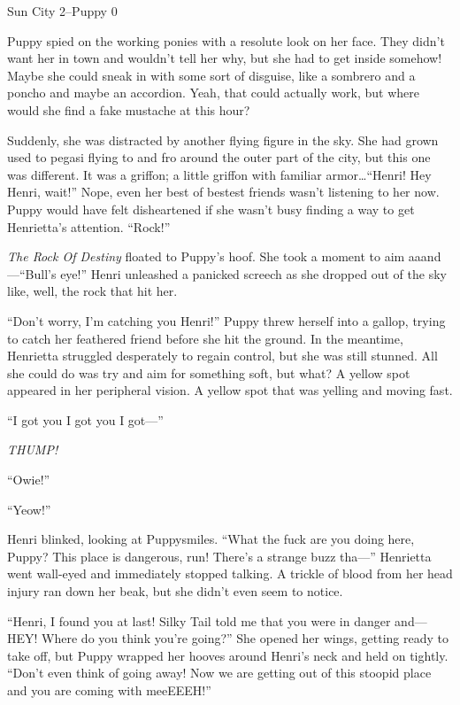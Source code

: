\begin{center}
	Sun City 2--Puppy 0
\end{center}

\horizonline


Puppy spied on the working ponies with a resolute look on her face. They didn't want her in town and wouldn't tell her why, but she had to get inside somehow! Maybe she could sneak in with some sort of disguise, like a sombrero and a poncho and maybe an accordion. Yeah, that could actually work, but where would she find a fake mustache at this hour?

Suddenly, she was distracted by another flying figure in the sky. She had grown used to pegasi flying to and fro around the outer part of the city, but this one was different. It was a griffon; a little griffon with familiar armor\dots ``Henri! Hey Henri, wait!'' Nope, even her best of bestest friends wasn't listening to her now. Puppy would have felt disheartened if she wasn't busy finding a way to get Henrietta's attention. ``Rock!''

\emph{The Rock Of Destiny} floated to Puppy's hoof. She took a moment to aim aaand---``Bull's eye!'' Henri unleashed a panicked screech as she dropped out of the sky like, well, the rock that hit her.

``Don't worry, I'm catching you Henri!'' Puppy threw herself into a gallop, trying to catch her feathered friend before she hit the ground. In the meantime, Henrietta struggled desperately to regain control, but she was still stunned. All she could do was try and aim for something soft, but what? A yellow spot appeared in her peripheral vision. A yellow spot that was yelling and moving fast.

``I got you I got you I got---''

\emph{THUMP!}

``Owie!''

``Yeow!''

Henri blinked, looking at Puppysmiles. ``What the fuck are you doing here, Puppy? This place is dangerous, run! There's a strange buzz tha---'' Henrietta went wall-eyed and immediately stopped talking. A trickle of blood from her head injury ran down her beak, but she didn't even seem to notice.

``Henri, I found you at last! Silky Tail told me that you were in danger and---HEY! Where do you think you're going?'' She opened her wings, getting ready to take off, but Puppy wrapped her hooves around Henri's neck and held on tightly. ``Don't even think of going away! Now we are getting out of this stoopid place and you are coming with meeEEEH!''


